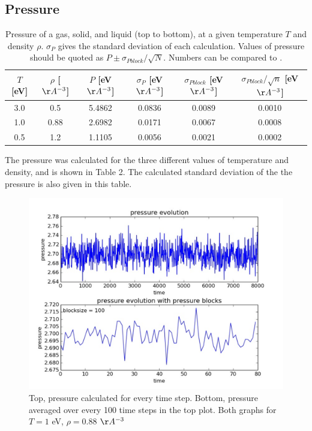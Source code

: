 \documentclass{article}
\begin{document}
\begin{multicols}{2}
\subsection{Pressure}

\begin{table}
\begin{center}
\begin{tabular}{| c | c | c | c | c | c |}
\hline  $T$ [eV] & $\rho$ [$\AA ^{-3}$] & $P$ [eV$\AA ^{-3}$] & $\sigma_{P}$ [eV$\AA ^{-3}$]  & $\sigma_{Pblock}$ [eV$\AA ^{-3}$] & $\sigma_{Pblock}/ \sqrt n$ [eV$\AA ^{-3}$] \\ \hline
  3.0 & 0.5 & 5.4862 & 0.0836 & 0.0089 & 0.0010 \\ \hline
  1.0 & 0.88 & 2.6982 & 0.0171 & 0.0067 & 0.0008 \\ \hline
  0.5 & 1.2 & 1.1105 & 0.0056 & 0.0021 & 0.0002 \\ \hline
\end{tabular}
\label{pressuretab}
\caption{Pressure of a gas, solid, and liquid (top to bottom), at a given temperature $T$ and density $\rho$.  $\sigma _P$ gives the standard deviation of each calculation.  Values of pressure should be quoted as $P \pm \sigma _{Pblock}/\sqrt{N}$.  Numbers can be compared to \cite{thijssen}.}
\end{center}
\end{table}

The pressure was calculated for the three different values of temperature and density, and is shown in Table 2.  The calculated standard deviation of the the pressure is also given in this table.  \\


\begin{figure}[H]
\begin{center}
\includegraphics[width=\linewidth]{plots/presn100lp10000T1rho088prt864.pdf}
\caption{Top, pressure calculated for every time step.  Bottom, pressure averaged over every 100 time steps in the top plot. Both graphs for $T = 1$ eV, $\rho = 0.88$ $\AA ^{-3}$}
\label{errex}
\end{center}
\end{figure}


\end{multicols}
\end{document}
